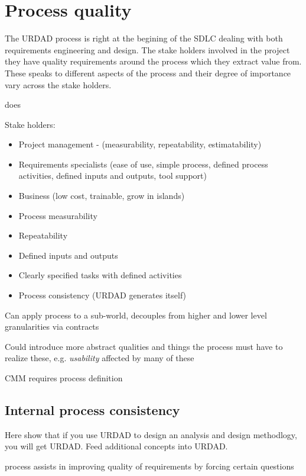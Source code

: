 \section{Process quality}

The URDAD process is right at the begining of the SDLC dealing with both requirements engineering and design. The stake holders
involved in the project they have quality requirements around the process which they extract value from. These speaks to different
aspects of the process and their degree of importance vary across the stake holders.

\cite{berard_what_1995}does 

Stake holders:
\begin{itemize}
  \item Project management - (measurability, repeatability, estimatability)
  \item Requirements specialists (ease of use, simple process, defined process activities, defined inputs and outputs, tool support)
  \item Business (low cost, trainable, grow in islands)
\end{itemize}


\begin{itemize}
  \item Process measurability
  \item Repeatability
  \item Defined inputs and outputs
  \item Clearly specified tasks with defined activities
  \item Process consistency (URDAD generates itself)
\end{itemize}

Can apply process to a sub-world, decouples from higher and lower level granularities via contracts

Could introduce more abstract qualities and things the process must have to realize these, e.g. \emph{usability} affected by many of these

CMM requires process definition


\subsection{Internal process consistency}

Here show that if you use URDAD to design an analysis and design methodlogy, you will get URDAD. Feed additional concepts into URDAD.

process assists in improving quality of requirements by forcing certain questions
